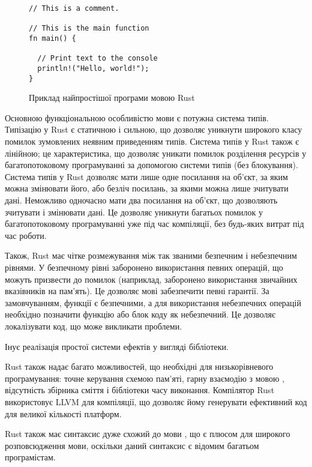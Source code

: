 \documentclass[main.tex]{subfiles}
\begin{document}
\begin{figure}[h]
  \centering
  \begin{verbatim}
// This is a comment.

// This is the main function
fn main() {

  // Print text to the console
  println!("Hello, world!");
}
  \end{verbatim}
  \caption{Приклад найпростішої програми мовою Rust}
  \label{example:rust}
\end{figure}

Основною функціональною особливістю мови є потужна система типів. Типізацію у Rust є статичною і сильною, що дозволяє уникнути широкого класу помилок зумовлених неявним приведенням типів. Система типів у Rust також є лінійною; це характеристика, що дозволяє уникати помилок розділення ресурсів у багатопотоковому програмуванні за допомогою системи типів (без блокування). Система типів у Rust дозволяє мати лише одне посилання на об'єкт, за яким можна змінювати його, або безліч посилань, за якими можна лише зчитувати дані. Неможливо одночасно мати два посилання на об'єкт, що дозволяють зчитувати і змінювати дані. Це дозволяє уникнути багатьох помилок у багатопотоковому програмуванні уже під час компіляції, без будь-яких витрат під час роботи.

Також, Rust має чітке розмежування між так званими безпечним і небезпечним рівнями. У безпечному рівні заборонено використання певних операцій, що можуть призвести до помилок (наприклад, заборонено використання звичайних вказівників на пам'ять). Це дозволяє мові забезпечити певні гарантії. За замовчуванням, функції є безпечними, а для використання небезпечних операцій необхідно позначити функцію або блок коду як небезпечний. Це дозволяє локалізувати код, що може викликати проблеми.

Інує реалізація простої системи ефектів у вигляді бібліотеки.

Rust також надає багато можливостей, що необхідні для низькорівневого програмування: точне керування схемою пам'яті, гарну взаємодію з мовою \LangC{}, відсутність збірника сміття і бібліотеки часу виконання. Компілятор Rust використовує LLVM\cite{llvm} для компіляції, що дозволяє йому генерувати ефективний код для великої кількості платформ.

Rust також має синтаксис дуже схожий до мови \LangC{}, що є плюсом для широкого розповсюдження мови, оскільки даний синтаксис є відомим багатьом програмістам.

\chapterconslusions{}
\end{document}
